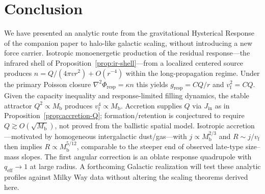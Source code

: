 \documentclass[11pt]{article}
\theoremstyle{definition}
\theoremstyle{remark}
\newcommand{\Mb}{M_{\mathrm{b}}}
\newcommand{\vf}{v_{\mathrm{f}}}
\newcommand{\qeff}{q_{\mathrm{eff}}}
\begin{document}
\section{Conclusion}
\label{sec:conclusion}
We have presented an analytic route from the gravitational Hysterical Response of the companion paper to halo-like galactic scaling, without introducing a new force carrier.
Isotropic monoenergetic production of the residual response---the infrared shell of Proposition~\ref{prop:ir-shell}---from a localized centered source produces $n=Q/(4\pi v r^{2})+O(r^{-4})$ within the long-propagation regime.
Under the primary Poisson closure $\nabla^{2}\Phi_{\mathrm{resp}}=\kappa n$ this yields $g_{\mathrm{resp}}=CQ/r$ and $\vf^{2}=CQ$.
Given the capacity inequality and response-limited filling dynamics, the stable attractor $Q^{2}\propto\Mb$ produces $\vf^{4}\propto\Mb$.
Accretion supplies $Q$ via $J_{\mathrm{in}}$ as in Proposition~\ref{prop:accretion-Q}; formation/retention is conjectured to require $\boxed{Q\gtrsim O(\sqrt{\Mb})}$, not proved from the ballistic spatial model.
Isotropic accretion---motivated by homogeneous intergalactic dust/gas---with $j\propto\Mb^{2/3}$ and $R\sim j/\vf$ then implies $R\propto\Mb^{5/12}$, comparable to the steeper end of observed late-type size--mass slopes.
The first angular correction is an oblate response quadrupole with $\qeff\to1$ at large radius.
A forthcoming Galactic realization will test these analytic profiles against Milky Way data without altering the scaling theorems derived here.



\end{document}
